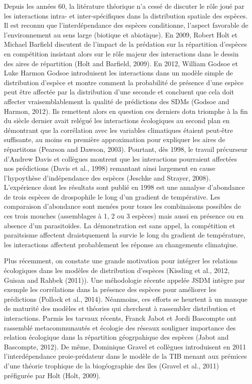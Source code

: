 Depuis les années 60, la litérature théorique n'a cessé de discuter le
rôle joué par les interactions intra- et inter-spécifiques dans la
distribution spatiale des espèces. Il est reconnu que l'interdépendance
des espèces conditionne, l'aspect favorable de l'environnement au sens
large (biotique et abiotique). En 2009, Robert Holt et Michael Barfield
discutent de l'impact de la prédation sur la répartition d'espèces en
compétition insistant alors sur le rôle majeur des interactions dans le
dessin des aires de répartition (Holt and Barfield, 2009). En 2012,
William Godsoe et Luke Harmon Godsoe introduisent les interactions dans
un modèle simple de distribution d'espèce et montre comment la
probabilité de présence d'une espèce peut être affectée par la
distribution d'une seconde et concluent que cela doit affecter
vraisemblablement la qualité de prédictions des SDMs (Godsoe and Harmon,
2012). Ils remettent alors en question ces derniers dotn triomphe à la
fin du siècle dernier avait relégué les interactions écologiques au
second plan en démontrant que la corrélation avec les variables
climatiques étaient peut-être suffisante, au moins en première
approximation pour expliquer les aires de répartitons (Pearson and
Dawson, 2003). Pourtant, dès 1998, le travail précurseur d'Andrew Davis
et collègues montrent que les interactions pourraient affectées nos
prédictions (Davis et al., 1998) remantant ainsi largement en cause
l'hypoythèse d'indépendance des espèces (Jeschke and Strayer, 2008).
L'expérience dont les résultats sont publié en 1998 est une annalyse
d'abondance de trois espèces de drospophile le long d'un gradient de
températive. Les comparaison d'abondance sont menées pour toues les
combinaisons possibles de ces trois mouches (assemblages à 1, 2 ou 3
espèces) mais aussi en présence ou en absence d'un parasitoïdes. La
démonstration est sans appel, la compétition et paraitsisme affectent
draistquement la survie le long du gradient de température, les
interactions affectent probablement les réponse au changements
climatqiue.

Plus récemment, on constate une grande motivation pour intégrer les
relations écologiques dans les modèles de distribution d'espèces
(Kissling et al., 2012, Guisan and Rahbek (2011)). Une méhodologie
récente appelée JSDM intègre par exemple les corrélations dans la
présence des espèces pour améliorer les prédictions (Pollock et al.,
2014). Néanmoins, ces efforts se heurtent à un manque de maturité des
modèles et théories qui cherchent à rassembler distribution et
interactions. Parmis les tarvaux récents, Franck Jabot et Jordi
Bascompte ont rassemblé metacommunautés et écologie des réseaux
souligner importance des relation écologique dans la répartition
géogrpahique des espèces (Jabot and Bascompte, 2012). De même, Dominique
Gravel et collègues introduisent en 2011 l'interdépendance
proie-prédateur dans le modèle de la TIB menant aux prémices d'une
théorie trophique de la biogéographie des îles (Gravel et al., 2011)
préfigurée par Holt (Holt, 2009).

